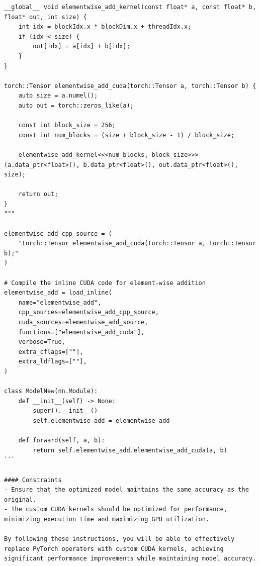 \documentclass{article} %
\begin{document}
\begin{instructbox}
\begin{lstlisting}
__global__ void elementwise_add_kernel(const float* a, const float* b, float* out, int size) {
    int idx = blockIdx.x * blockDim.x + threadIdx.x;
    if (idx < size) {
        out[idx] = a[idx] + b[idx];
    }
}

torch::Tensor elementwise_add_cuda(torch::Tensor a, torch::Tensor b) {
    auto size = a.numel();
    auto out = torch::zeros_like(a);

    const int block_size = 256;
    const int num_blocks = (size + block_size - 1) / block_size;

    elementwise_add_kernel<<<num_blocks, block_size>>>(a.data_ptr<float>(), b.data_ptr<float>(), out.data_ptr<float>(), size);

    return out;
}
"""

elementwise_add_cpp_source = (
    "torch::Tensor elementwise_add_cuda(torch::Tensor a, torch::Tensor b);"
)

# Compile the inline CUDA code for element-wise addition
elementwise_add = load_inline(
    name="elementwise_add",
    cpp_sources=elementwise_add_cpp_source,
    cuda_sources=elementwise_add_source,
    functions=["elementwise_add_cuda"],
    verbose=True,
    extra_cflags=[""],
    extra_ldflags=[""],
)

class ModelNew(nn.Module):
    def __init__(self) -> None:
        super().__init__()
        self.elementwise_add = elementwise_add

    def forward(self, a, b):
        return self.elementwise_add.elementwise_add_cuda(a, b)
```

#### Constraints
- Ensure that the optimized model maintains the same accuracy as the original.
- The custom CUDA kernels should be optimized for performance, minimizing execution time and maximizing GPU utilization.

By following these instructions, you will be able to effectively replace PyTorch operators with custom CUDA kernels, achieving significant performance improvements while maintaining model accuracy.
\end{lstlisting}
\end{instructbox}

\section{}\label{appendix:computational_overhead}
\end{document}
